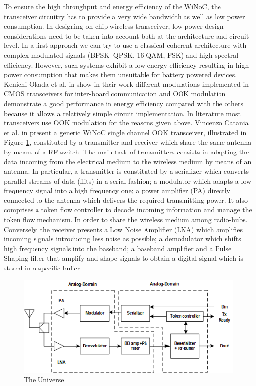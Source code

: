 \documentclass[12pt]{article}
\begin{document}
To ensure the high throughput and energy efficiency of the WiNoC, the transceiver circuitry has to provide a very wide bandwidth as well as low power consumption. In designing on-chip wireless transceiver, low power design considerations need to be taken into account both at the architecture and circuit level. In a first approach we can try to use a classical coherent architecture with complex modulated signals (BPSK, QPSK, 16-QAM, FSK) and high spectral efficiency. However, such systems exhibit a low energy efficiency resulting in high power consumption that makes them unsuitable for battery powered devices. Kenichi Okada et al. in \citep {6339016} show in their work different modulations implemented in CMOS transceivers for inter-board communication and OOK modulation demonstrate a good performance in energy efficiency compared with the others because it allows a relatively simple circuit implementation. In literature most transceivers use OOK modulation for the reasons given above. Vincenzo Catania et al. in \citep{7459514} present a  generic WiNoC single channel OOK transceiver, illustrated in Figure \ref{fig:Fig_transceiverOOK3}, constituted by a transmitter and receiver which share the same antenna by means of a RF-switch. The main task of transmitters consists in adapting the data incoming from the electrical medium to the wireless medium by means of an antenna. In particular, a transmitter is constituted by a serializer which converts parallel streams of data (flits) in a serial fashion; a modulator which adapts a low frequency signal into a high frequency one; a power amplifier (PA) directly connected to the antenna which delivers the required transmitting power. It also comprises a token flow controller to decode incoming information and manage the token flow mechanism. In order to share the wireless medium among radio-hubs. Conversely, the receiver presents a Low Noise Amplifier (LNA) which amplifies incoming signals introducing less noise as possible; a demodulator which shifts high frequency signals into the baseband; a baseband amplifier and a Pulse Shaping filter that amplify and shape signals to obtain a digital signal which is stored in a specific buffer. 

\begin{figure}[ht!]
\centering
\includegraphics[scale=0.9]{transceiverOOK3.png}
\caption{The Universe}
\label{fig:Fig_transceiverOOK3}
\end{figure}
\end{document}
